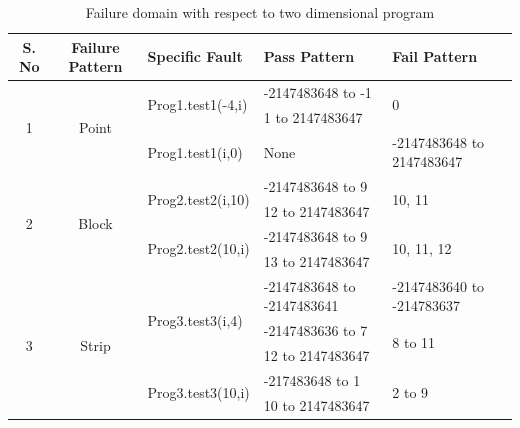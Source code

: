 \documentclass{acm_proc_article-sp}
\begin{document}
\begin{table}[t]
\centering

\begin{tabular}{|c|c|l|l|l|}

\hline 

\textbf{S. No}		& \textbf{Failure Pattern}	& \textbf{Specific Fault}	 		& \textbf{Pass Pattern} 			& \textbf{Fail Pattern} 			\\ \hline 


\multirow{3}{*}{1} 	&\multirow{3}{*}{Point}	&\multirow{2}{*}{Prog1.test1(-4,i)}	&-2147483648 to -1				&\multirow{2}{*}{0}	  			\\ \cline{4-4} 
				&					&							&1 to 2147483647				&	                           			\\ \cline{3-5}
				&					&Prog1.test1(i,0)				&None						&-2147483648 to 2147483647 	\\ \hline
\multirow{4}{*}{2}	&\multirow{4}{*}{Block}	&\multirow{2}{*}{Prog2.test2(i,10)}	&-2147483648 to 9				&\multirow{2}{*}{10, 11}			\\ \cline{4-4} 
				&					&							&12 to 2147483647				&		   		   			\\ \cline{3-5} 
				&					&\multirow{2}{*}{Prog2.test2(10,i)}	&-2147483648 to 9				&\multirow{2}{*}{10, 11, 12}		\\ \cline{4-4} 
				&					&							&13 to 2147483647				&							\\ \hline
\multirow{5}{*}{3} 	&\multirow{5}{*}{Strip}	&\multirow{3}{*}{Prog3.test3(i,4)}	&-2147483648 to -2147483641	&-2147483640 to -214783637 		\\ \cline{4-5} 
				&					&	 						&-2147483636 to 7				&\multirow{2}{*}{8 to 11}			\\ \cline{4-4} 
				&					&	 						&12 to 2147483647				&							\\ \cline{3-5} 
				&					& \multirow{2}{*}{Prog3.test3(10,i)}	&-217483648 to 1				&\multirow{2}{*}{2 to 9}			\\ \cline{4-4}
				&					&	 						&10 to 2147483647				&							\\ \hline
\end{tabular}
\caption{Failure domain with respect to two dimensional program}
\label{tb:failtable}
\end{table}

\end{document}
